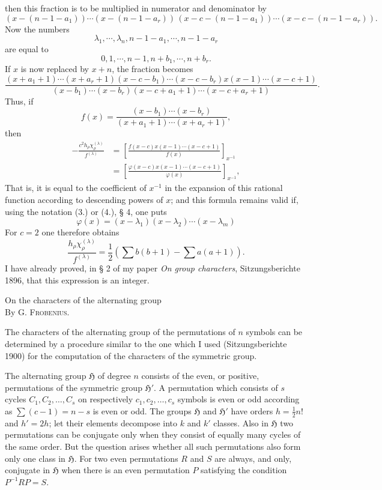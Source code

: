 \documentclass[11pt]{article}
\newcommand{\Hgr}{\mathfrak{H}}
\newcommand{\frobtitle}[1]{\begin{center}{\Large #1}\\[0.75em]By G. \textsc{Frobenius}.\end{center}\vspace{0.5em}}
\begin{document}
then this fraction is to be multiplied in numerator and denominator by
\[
 (x-(n-1-a_1))\cdots(x-(n-1-a_r))\,(x-c-(n-1-a_1))\cdots(x-c-(n-1-a_r)).
\]
Now the numbers
\[
 \lambda_1,
\cdots,
\lambda_n,
 n-1-a_1,
\cdots,n-1-a_r
\]
are equal to
\[
 0,1,
\cdots,n-1,
 n+b_1,
\cdots,n+b_r.
\]
If $x$ is now replaced by $x+n$, the fraction becomes
\[
 \frac{(x+a_1+1)\cdots(x+a_r+1)(x-c-b_1)\cdots(x-c-b_r)x(x-1)\cdots(x-c+1)}{(x-b_1)\cdots(x-b_r)(x-c+a_1+1)\cdots(x-c+a_r+1)}.
\]
Thus, if
\begin{equation}\tag{13.}
 f(x)=\frac{(x-b_1)\cdots(x-b_r)}{(x+a_1+1)\cdots(x+a_r+1)},
\end{equation}
then
\begin{equation}\tag{14.}
\begin{aligned}
 -\frac{c^2h_\rho\chi_\rho^{(\lambda)}}{f^{(\lambda)}}
 &=\left[\frac{f(x-c)x(x-1)\cdots(x-c+1)}{f(x)}\right]_{x^{-1}}\\
 &=\left[\frac{\varphi(x-c)x(x-1)\cdots(x-c+1)}{\varphi(x)}\right]_{x^{-1}},
\end{aligned}
\end{equation}
That is, it is equal to the coefficient of $x^{-1}$ in the expansion of this rational function according to descending powers of $x$; and this formula remains valid if, using the notation (3.) or (4.), § 4, one puts
\begin{equation}\tag{15.}
 \varphi(x)=(x-
\lambda_1)(x-
\lambda_2)\cdots(x-
\lambda_m)
\end{equation}
For $c=2$ one therefore obtains
\begin{equation}\tag{16.}
 \frac{h_\rho\chi_\rho^{(\lambda)}}{f^{(\lambda)}}=\frac12\left(\sum b(b+1)-\sum a(a+1)\right).
\end{equation}
I have already proved, in § 2 of my paper \emph{On group characters}, Sitzungsberichte 1896, that this expression is an integer.

\clearpage

\frobtitle{On the characters of the alternating group}

The characters of the alternating group of the permutations of $n$ symbols can be determined by a procedure similar to the one which I used (Sitzungsberichte 1900) for the computation of the characters of the symmetric group.

The alternating group $\Hgr$ of degree $n$ consists of the even, or positive, permutations of the symmetric group $\Hgr'$. A permutation which consists of $s$ cycles $C_1,C_2,\ldots,C_s$ on respectively $c_1,c_2,\ldots,c_s$ symbols is even or odd according as $\sum(c-1)=n-s$ is even or odd. The groups $\Hgr$ and $\Hgr'$ have orders $h=\frac12 n!$ and $h'=2h$; let their elements decompose into $k$ and $k'$ classes. Also in $\Hgr$ two permutations can be conjugate only when they consist of equally many cycles of the same order. But the question arises whether all such permutations also form only one class in $\Hgr$. For two even permutations $R$ and $S$ are always, and only, conjugate in $\Hgr$ when there is an even permutation $P$ satisfying the condition $P^{-1}RP=S$.
\end{document}
